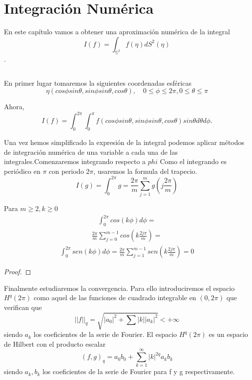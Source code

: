 \chapter[Integración Numérica]{Integración Numérica}
En este capítulo vamos a obtener una aproximación numérica de la integral $$ I(f) = \int_{\mathds{S}^2} f(\eta) dS^2(\eta) $$. 
\section{}
En primer lugar tomaremos la siguientes coordenadas esféricas
$$ \eta (cos\phi sin\theta, sin\phi sin\theta,cos \theta), \quad 0\le \phi \le 2\pi, 0\le \theta \le \pi$$
 
Ahora, 
$$
I(f) = \int_{0}^{2\pi} \int_{0}^{\pi} f(cos\phi sin\theta, sin\phi sin\theta,cos \theta)sin\theta d\theta d\phi. 
$$

Una vez hemos simplificado la expresión de la integral podemos aplicar métodos de integración numérica de una variable a cada una de las integrales.Comenzaremos integrando respecto a $phi$
\medskip
Como el integrando es periódico en $\pi$ con periodo $2\pi$, usaremos la formula del trapecio.
$$
I(g)=\int_{0}^{2\pi} g = \frac{2\pi}{m} \sum_{j=1}^{m} g(j\frac{2\pi}{m})
$$

\begin{lem} Para $m\ge 2,k\ge 0$
	\begin{gather}
	\int_{0}^{2\pi} cos(k\phi)d\phi = 
	\end{gather}
	\begin{gather}
	\frac{2\pi}{m}\sum_{j=0}^{m-1}cos(k\frac{2j\pi}{m}) = 
	\end{gather}
	\begin{gather}
	\int_{0}^{2\pi} sen(k\phi)d\phi =  \frac{2\pi}{m}\sum_{j=1}^{m-1}sen(k\frac{2j\pi}{m}) =0 
	\end{gather}
\end{lem}
\begin{proof}
	
\end{proof}

Finalmente estudiaremos la convergencia. Para ello introduciremos el espacio $H^q(2\pi)$ como aquel de las funciones de cuadrado integrable en $(0,2\pi)$ que verifican que 
$$
||f||_q = \sqrt{|a_0|^2+\sum_{}^{}|k||a_k|^2} < +\infty
$$
siendo $a_k$ los coeficientes de la serie de Fourier.
El espacio $H^q(2\pi)$ es un espacio de Hilbert con el producto escalar 
$$ (f,g)_q = a_0b_0 + \sum_{k=1}^{\infty}|k|^{2q} a_kb_k $$ siendo $a_k,b_k$ los coeficientes de la serie de Fourier para f y g respectivamente. 

